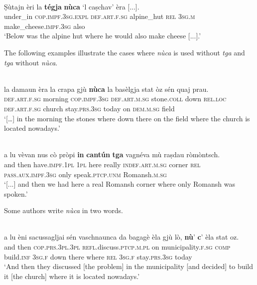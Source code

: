 \ea
\label{ex:relloc4}
\\
\gll Ṣùtajn èri la \textbf{tégja} \textbf{nùca} `l caṣchav' èra [...].\\
under\_in \textsc{cop.impf.3sg.expl} \textsc{def.art.f.sg} alpine\_hut \textsc{rel} \textsc{3sg.m} make\_cheese.\textsc{impf.3sg} also\\
\glt `Below was the alpine hut where he would also make cheese [...].'
\z

The following examples illustrate the cases where \textit{nùca} is used without \textit{tga} and \textit{tga} without \textit{nùca}.

\ea
\label{ex:relloc5}
\\
\gll    […] la damaun èra la crapa gjù \textbf{nùca} la basèlgja stat òz sén quaj prau.\\
{} \textsc{def.art.f.sg} morning \textsc{cop.impf.3sg} \textsc{def.art.m.sg} stone.\textsc{coll} down \textsc{rel.loc} \textsc{def.art.f.sg} church stay.\textsc{prs.3sg} today on \textsc{dem.m.sg} field\\
\glt `[…] in the morning the stones where down there on the field where the church is located nowadays.'
\z

\ea
\label{ex:relloc6}
\\
\gll [...] a lu vèvan nus cò pròpi \textbf{in} \textbf{cantún} \textbf{tga} vagnéva mù raṣdau ròmòntsch.\\
{} and then have.\textsc{impf.1pl} \textsc{1pl} here really \textsc{indef.art.m.sg} corner \textsc{rel} \textsc{pass.aux.impf.3sg} only speak.\textsc{ptcp.unm} Romansh.\textsc{m.sg} \\
\glt `[...] and then we had here a real Romansh corner where only Romansh was spoken.'
\z

Some authors write \textit{nùca} in two words.

\ea\label{}
\\
\gll    [...] a lu èni sacussagljai sén vaschnaunca da bagagè èla gjù lò, \textbf{nù}' \textbf{c}' èla stat oz. \\
     {} and then \textsc{cop.prs.3pl.3pl} \textsc{refl}.discuss.\textsc{ptcp.m.pl} on municipality.\textsc{f.sg} \textsc{comp} build.\textsc{inf} \textsc{3sg.f} down there where \textsc{rel} \textsc{3sg.f} stay.\textsc{prs.3sg} today\\
\glt `And then they discussed [the problem] in the municipality [and decided] to build it [the church] where it is located nowadays.'
\z

